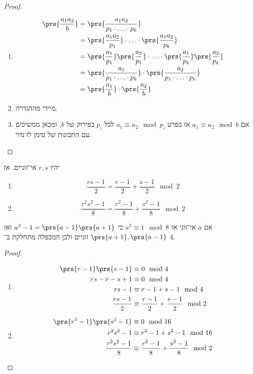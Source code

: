 \documentclass[a4paper,10pt,twoside,openany]{book}
\begin{document}
\begin{proof}
\begin{enumerate}
\item %
\begin{align*}
\prs{\frac{a_1 a_2}{b}} &= \prs{\frac{a_1 a_2}{p_1 \cdot \ldots \cdot p_k}} \\&=
\prs{\frac{a_1 a_2}{p_1}} \cdot \ldots \cdot \prs{\frac{a_1 a_2}{p_k}} \\&=
\prs{\frac{a_1}{p_1}}\prs{\frac{a_2}{p_1}} \cdot \ldots \cdot  \prs{\frac{a_1}{p_k}}\prs{\frac{a_2}{p_k}} \\&=
\prs{\frac{a_1}{p_1 \cdot \ldots \cdot p_k}} \cdot \prs{\frac{a_2}{p_1 \cdot \ldots \cdot p_k}} \\&= \prs{\frac{a_1}{b}} \cdot \prs{\frac{a_2}{b}}
\end{align*}

\item %
מיידי מההגדרה.

\item %
אם
$a_1 \equiv a_2 \mod{b}$
אז בפרט
$a_1 \equiv a_2 \mod{p_i}$
לכל
$p_i$
בפירוק של
$b$,
ומכאן ממשיכים עם התכונות של סימן לז'נדר.
\end{enumerate}
\end{proof}

\begin{lemma} \label{jacobi-lemma}
יהיו
$r,s$
אי־זוגיים. אז
\begin{enumerate}
\item \[\frac{rs - 1}{2} = \frac{r-1}{2} + \frac{s-1}{2} \mod{2}\] \label{jacobi-lemma:formula}
\item \[\frac{r^2 s^2 - 1}{8} = \frac{r^2 - 1}{8} + \frac{s^2 - 1}{8} \mod{2}\] \label{jacobi-lemma:square-formula}
\end{enumerate}
\end{lemma}

\begin{remark}
אם
$a$
אי־זוגי אז
$a^2 \equiv 1\mod{8}$
כי
$a^2 - 1 = \prs{a-1} \prs{a+1}$
ואז
$\prs{a+1},\prs{a-1}$
זוגיים ולכן המכפלה מתחלקת ב־%
$4$.
\end{remark}

\begin{proof}
\begin{enumerate}
\item \begin{align*}
\prs{r-1}\prs{s-1}&\equiv 0 \mod{4} \\
rs - r - s + 1 &\equiv 0 \mod{4} \\
rs - 1 &\equiv r - 1 + s - 1 \mod{4} \\
\frac{rs - 1}{2} &\equiv \frac{r-1}{2} + \frac{s-1}{2} \mod{2}
\end{align*}
\item
\begin{align*}
\prs{r^2 - 1}\prs{s^2 - 1} &\equiv 0 \mod{16} \\
r^2 s^2 - 1 &\equiv r^2 - 1 + s^2 - 1 \mod{16} \\
\frac{r^2 s^2 - 1}{8} &\equiv \frac{r^2 - 1}{8} + \frac{s^2 - 1}{8} \mod{2}
\end{align*}
\end{enumerate}
\end{proof}
\end{document}
